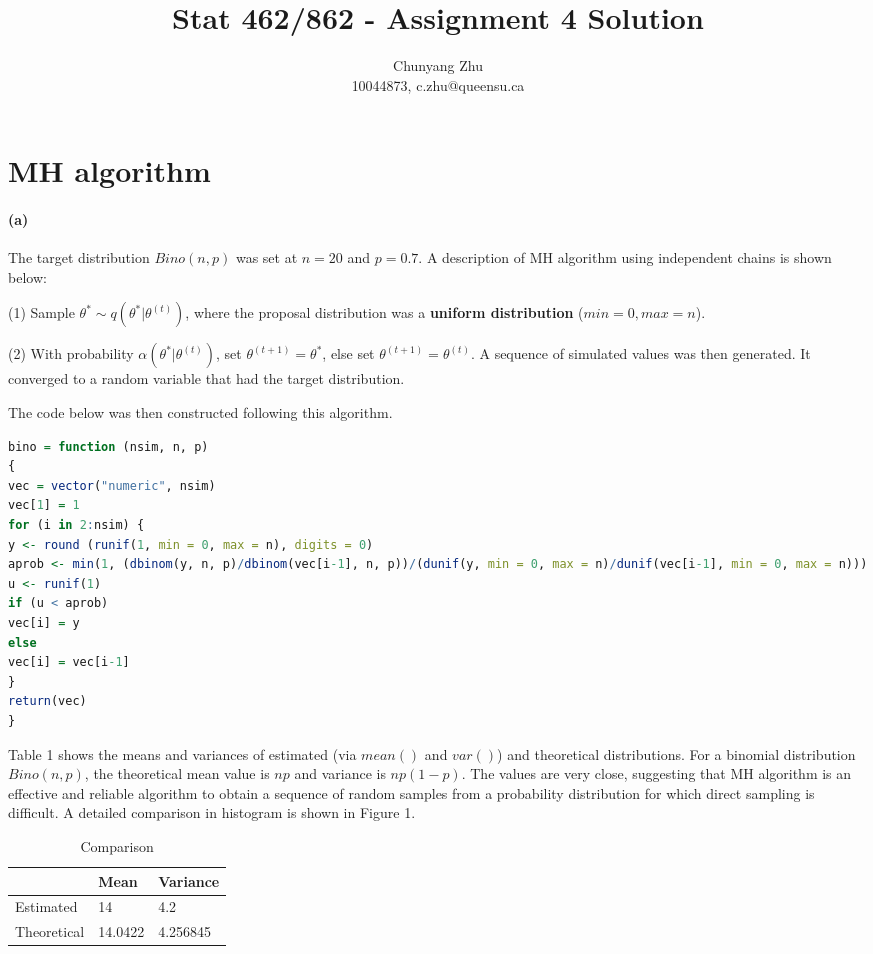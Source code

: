 \documentclass[10pt, letterpaper]{proc}
\title{Stat 462/862 - Assignment 4 Solution}
\author{Chunyang Zhu\\
	 10044873, c.zhu@queensu.ca}
\begin{document}
\maketitle

\section{MH algorithm}
\paragraph{(a)} The target distribution $Bino(n,p)$ was set at $n = 20$ and $p = 0.7$. A description of MH algorithm using independent chains is shown below:

(1) Sample $\theta^\ast \sim q(\theta^\ast | \theta^{(t)})$, where the proposal distribution was a \textbf{uniform distribution} ($min = 0, max = n$).

(2) With probability $ \alpha(\theta^\ast | \theta^{(t)})$, set $ \theta^{(t+1)} = \theta^\ast$, else set $ \theta^{(t+1)} = \theta^{(t)}$. A sequence of simulated values was then generated. It converged to a random variable that had the target distribution. 

The code below was then constructed following this algorithm. 
\begin{lstlisting}[language=R, breaklines=T, basicstyle=\footnotesize\ttfamily]
bino = function (nsim, n, p) 
{
vec = vector("numeric", nsim)
vec[1] = 1
for (i in 2:nsim) {
y <- round (runif(1, min = 0, max = n), digits = 0)
aprob <- min(1, (dbinom(y, n, p)/dbinom(vec[i-1], n, p))/(dunif(y, min = 0, max = n)/dunif(vec[i-1], min = 0, max = n)))
u <- runif(1)
if (u < aprob) 
vec[i] = y
else 
vec[i] = vec[i-1]
}
return(vec)
}
\end{lstlisting}

Table 1 shows the means and variances of estimated (via $mean()$ and $var()$) and theoretical distributions. For a binomial distribution $Bino(n,p)$, the theoretical mean value is $np$ and variance is $np(1-p)$. The values are very close, suggesting that MH algorithm is an effective and reliable algorithm to obtain a sequence of random samples from a probability distribution for which direct sampling is difficult. A detailed comparison in histogram is shown in Figure 1. 

\begin{table}[h]
\centering
\caption{Comparison}
\begin{tabular}{lll}
	\hline  & Mean & Variance \\ 
	\hline Estimated & 14 & 4.2 \\ 
	Theoretical & 14.0422 & 4.256845 \\ 
	\hline 
\end{tabular} 
\end{table}
\end{document}

